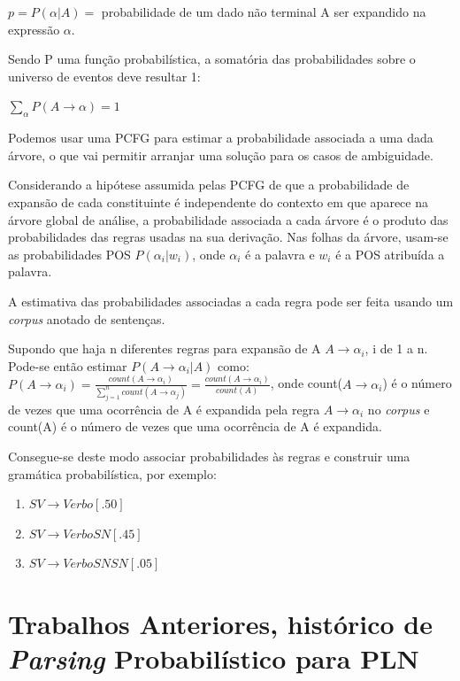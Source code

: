$p=P(\alpha |A) = $ probabilidade de um dado não terminal A ser expandido na expressão $ \alpha. $

Sendo P uma função probabilística, a somatória das probabilidades sobre o universo de eventos deve resultar 1: 

$\sum_\alpha P(A \rightarrow \alpha)=1 $

Podemos usar uma PCFG para estimar a probabilidade associada a uma dada árvore, o que vai permitir arranjar uma solução para os casos de ambiguidade. 

Considerando a hipótese assumida pelas PCFG de que a probabilidade de expansão de cada constituinte é independente do contexto em que aparece na árvore global de análise, a probabilidade associada a cada árvore é o produto das probabilidades das regras usadas na sua derivação. Nas folhas da árvore, usam-se as probabilidades POS $P(\alpha_i|w_i)$, onde  $\alpha_i$ é a palavra e $w_i$ é a POS atribuída a palavra.

A estimativa das probabilidades associadas a cada regra pode ser feita usando um \emph{corpus} anotado de sentenças.

Supondo que haja n diferentes regras para expansão de A $A \rightarrow \alpha_i $, i de 1 a n.
\\
Pode-se então estimar $P(A \rightarrow \alpha_i|A)$ como:
\\

$ P(A \rightarrow \alpha_i) = \frac{count(A \rightarrow \alpha_i)}{\sum_{j=1}^n count(A \rightarrow \alpha_j)} = \frac{count(A \rightarrow \alpha_i)}{count(A)} $, onde count($A \rightarrow \alpha_i$) é o número de vezes que uma ocorrência de A é expandida pela regra $A \rightarrow \alpha_i$ no \emph{corpus} e count(A) é o número de vezes que uma ocorrência de A é expandida.

Consegue-se deste modo associar probabilidades às regras e construir uma gramática probabilística, por exemplo:

\begin{enumerate}
  \item  $SV \rightarrow Verbo [.50]$
  \item  $SV \rightarrow Verbo SN [.45]$
  \item  $SV \rightarrow Verbo SN SN [.05]$
\end{enumerate}


\section{Trabalhos Anteriores, histórico de \emph{Parsing} Probabilístico para PLN}
\label{sec:trab_anter}


